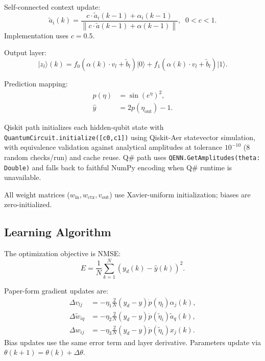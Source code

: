\documentclass[conference]{IEEEtran}
\begin{document}
Self-connected context update:
\begin{equation}
\tilde a_i(k)=\frac{c\cdot\tilde a_i(k-1)+\alpha_i(k-1)}{\left\|c\cdot\tilde a(k-1)+\alpha(k-1)\right\|},\;\;0<c<1. \label{eq15}
\end{equation}
Implementation uses $c=0.5$.

Output layer:
\begin{equation}
\lvert z_l\rangle(k)=f_0(\alpha(k)\cdot v_l+\tilde b_l)\lvert0\rangle + f_1(\alpha(k)\cdot v_l+\tilde b_l)\lvert1\rangle. \label{eq16}
\end{equation}

Prediction mapping:
\begin{align}
p(\eta) &= \sin(e^{\eta})^2, \label{eq17}\\
\hat y &= 2p(\eta_{\text{out}})-1. \label{eq18}
\end{align}

Qiskit path initializes each hidden-qubit state with \texttt{QuantumCircuit.initialize([c0,c1])} using Qiskit-Aer statevector simulation, with equivalence validation against analytical amplitudes at tolerance $10^{-10}$ (8 random checks/run) and cache reuse. Q\# path uses \texttt{QENN.GetAmplitudes(theta: Double)} and falls back to faithful NumPy encoding when Q\# runtime is unavailable.

All weight matrices ($w_{\text{in}},w_{\text{ctx}},v_{\text{out}}$) use Xavier-uniform initialization; biases are zero-initialized.

\subsection{Learning Algorithm}
The optimization objective is NMSE:
\begin{equation}
E=\frac{1}{N}\sum_{k=1}^{N}\left(y_d(k)-\hat y(k)\right)^2. \label{eq19}
\end{equation}

Paper-form gradient updates are:
\begin{align}
\Delta v_{lj} &= -\eta_1\frac{2}{N}(y_d-y)\dot p(\eta_l)\alpha_j(k), \label{eq20}\\
\Delta\tilde w_{iq} &= -\eta_2\frac{2}{N}(y_d-y)\dot p(\tilde\eta_i)\tilde a_q(k), \label{eq21}\\
\Delta w_{ij} &= -\eta_3\frac{2}{N}(y_d-y)\dot p(\tilde\eta_i)x_j(k). \label{eq22}
\end{align}
Bias updates use the same error term and layer derivative. Parameters update via $\theta(k+1)=\theta(k)+\Delta\theta$.
\end{document}
